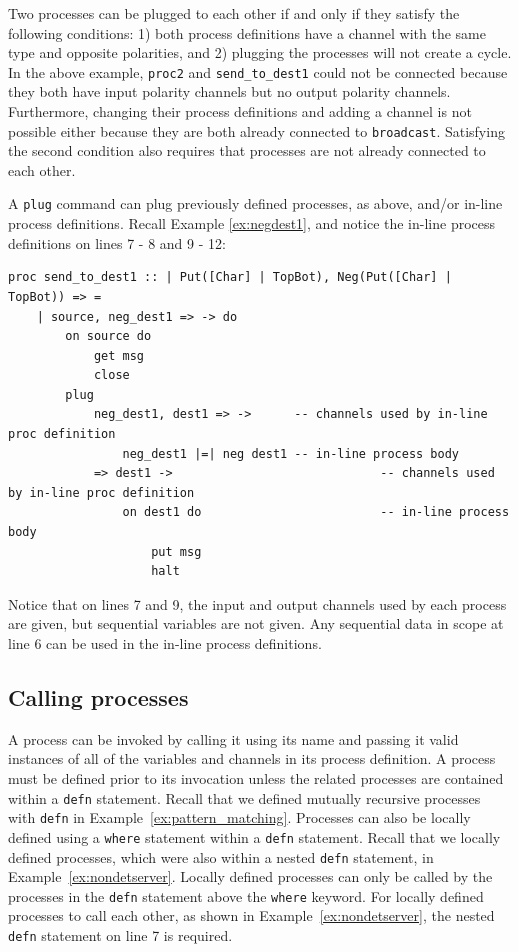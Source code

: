 \documentclass[11pt]{article}
\begin{document}
Two processes can be plugged to each other if and only if they satisfy the following conditions: 1) both process definitions have a channel with the same type and opposite polarities, and 2) plugging the processes will not create a cycle.
In the above example, \lstinline$proc2$ and \lstinline$send_to_dest1$ could not be connected because they both have input polarity channels but no output polarity channels.
Furthermore, changing their process definitions and adding a channel is not possible either because they are both already connected to \lstinline$broadcast$.
Satisfying the second condition also requires that processes are not already connected to each other.

A \lstinline$plug$ command can plug previously defined processes, as above, and/or in-line process definitions.
Recall Example \ref{ex:negdest1}, and notice the in-line process definitions on lines 7 - 8 and 9 - 12:
\begin{lstlisting}
proc send_to_dest1 :: | Put([Char] | TopBot), Neg(Put([Char] | TopBot)) => =
	| source, neg_dest1 => -> do
		on source do						
			get msg
			close
		plug
			neg_dest1, dest1 => -> 		-- channels used by in-line proc definition
				neg_dest1 |=| neg dest1 -- in-line process body
			=> dest1 -> 							-- channels used by in-line proc definition
				on dest1 do							-- in-line process body
					put msg
					halt
\end{lstlisting}
Notice that on lines 7 and 9, the input and output channels used by each process are given, but sequential variables are not given.
Any sequential data in scope at line 6 can be used in the in-line process definitions.

\subsection{Calling processes}
\label{sec:calling_procs}

A process can be invoked by calling it using its name and passing it valid instances of all of the variables and channels in its process definition.
A process must be defined prior to its invocation unless the related processes are contained within a \lstinline{defn} statement.
Recall that we defined mutually recursive processes with \lstinline{defn} in Example~\ref{ex:pattern_matching}.
Processes can also be locally defined using a \lstinline{where} statement within a \lstinline{defn} statement.
Recall that we locally defined processes, which were also within a nested \lstinline{defn} statement, in Example~\ref{ex:nondetserver}.
Locally defined processes can only be called by the processes in the \lstinline{defn} statement above the \lstinline{where} keyword.
For locally defined processes to call each other, as shown in Example~\ref{ex:nondetserver}, the nested \lstinline{defn} statement on line 7 is required.
\end{document}
